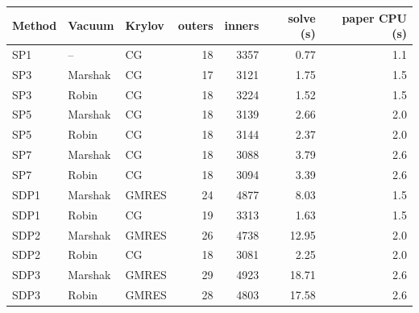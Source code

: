 \begin{tabular}{lllrrrr}
\hline
Method & Vacuum & Krylov & outers & inners & solve (s) & paper CPU (s) \\
\hline
SP1 & -- & CG & 18 & 3357 & 0.77 & 1.1 \\
SP3 & Marshak & CG & 17 & 3121 & 1.75 & 1.5 \\
SP3 & Robin & CG & 18 & 3224 & 1.52 & 1.5 \\
SP5 & Marshak & CG & 18 & 3139 & 2.66 & 2.0 \\
SP5 & Robin & CG & 18 & 3144 & 2.37 & 2.0 \\
SP7 & Marshak & CG & 18 & 3088 & 3.79 & 2.6 \\
SP7 & Robin & CG & 18 & 3094 & 3.39 & 2.6 \\
SDP1 & Marshak & GMRES & 24 & 4877 & 8.03 & 1.5 \\
SDP1 & Robin & CG & 19 & 3313 & 1.63 & 1.5 \\
SDP2 & Marshak & GMRES & 26 & 4738 & 12.95 & 2.0 \\
SDP2 & Robin & CG & 18 & 3081 & 2.25 & 2.0 \\
SDP3 & Marshak & GMRES & 29 & 4923 & 18.71 & 2.6 \\
SDP3 & Robin & GMRES & 28 & 4803 & 17.58 & 2.6 \\
\hline
\end{tabular}
